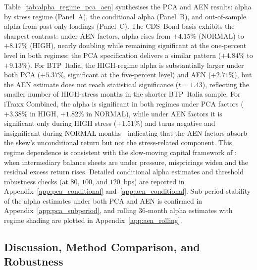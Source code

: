 Table~\ref{tab:alpha_regime_pca_aen} synthesises the PCA and AEN
results: alpha by stress regime (Panel~A), the
\citet{christopherson1998conditioning} conditional alpha (Panel~B), and
out-of-sample alpha from past-only loadings (Panel~C). The
CDS--Bond basis exhibits the sharpest contrast: under AEN factors,
alpha rises from $+4.15\%$ (NORMAL) to $+8.17\%$ (HIGH), nearly
doubling while remaining significant at the one-percent level in
both regimes; the PCA specification delivers a similar pattern
($+4.84\%$ to $+9.13\%$). For BTP~Italia, the HIGH-regime alpha
is substantially larger under both PCA ($+5.37\%$, significant at
the five-percent level) and AEN ($+2.71\%$), but the AEN estimate
does not reach statistical significance ($t = 1.43$), reflecting
the smaller number of HIGH-stress months in the shorter BTP~Italia
sample. For iTraxx Combined, the alpha is significant in both
regimes under PCA factors ($+3.38\%$ in HIGH, $+1.82\%$ in
NORMAL), while under AEN factors it is significant only during
HIGH stress ($+1.51\%$) and turns negative and insignificant
during NORMAL months---indicating that the AEN factors absorb
the skew's unconditional return but not the stress-related
component. This regime dependence is consistent with the
slow-moving capital framework of \citet{duffie2010presidential}:
when intermediary balance sheets are under pressure, mispricings
widen and the residual excess return rises.
Detailed \citet{christopherson1998conditioning} conditional alpha estimates and
threshold robustness checks (at $80$, $100$, and $120$~bps)
are reported in Appendix~\ref{app:pca_conditional}
and~\ref{app:aen_conditional}. Sub-period stability of the alpha
estimates under both PCA and AEN is confirmed in
Appendix~\ref{app:pca_subperiod}, and rolling 36-month alpha
estimates with regime shading are plotted in
Appendix~\ref{app:aen_rolling}. 
 
 
\subsection{Discussion, Method Comparison, and Robustness}
\label{sec:factor_discussion}
 
